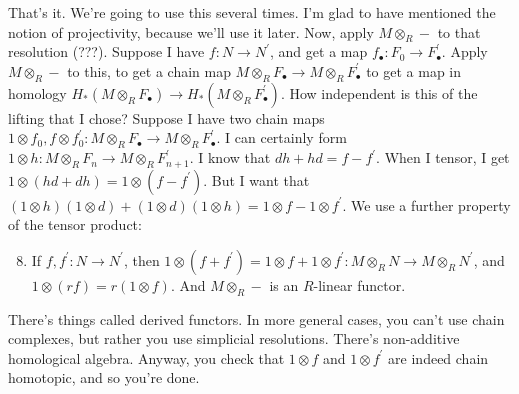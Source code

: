\documentclass{amsart}
\theoremstyle{theorem}
\theoremstyle{definition}
\begin{document}
That's it. We're going to use this several times. I'm glad to have mentioned the notion of projectivity, because we'll use it later. Now, apply $M\otimes_R -$ to that resolution (???). Suppose I have $f:N\to N^\prime$, and get a map $f_\bullet:F_0\to F^\prime_\bullet$. Apply $M\otimes_R -$ to this, to get a chain map $M\otimes_R F_\bullet\to M\otimes_R F^\prime_\bullet$ to get a map in homology $ H_\ast(M\otimes_R F_\bullet)\to H_\ast(M\otimes_R F^\prime_\bullet)$. How independent is this of the lifting that I chose? Suppose I have two chain maps $1\otimes f_0,f\otimes f_0^\prime:M\otimes_R F_\bullet\to M\otimes_R F^\prime_\bullet$. I can certainly form $1\otimes h:M\otimes_R F_n\to M\otimes_R F^\prime_{n+1}$. I know that $dh+hd=f-f^\prime$. When I tensor, I get $1\otimes(hd+dh)=1\otimes(f-f^\prime)$. But I want that $(1\otimes h)(1\otimes d)+(1\otimes d)(1\otimes h)=1\otimes f-1\otimes f^\prime$. We use a further property of the tensor product:
\begin{enumerate}
\setcounter{enumi}{7}
\item If $f,f^\prime:N\to N^\prime$, then $1\otimes(f+f^\prime)=1\otimes f+1\otimes f^\prime:M\otimes_R N\to M\otimes_R N^\prime$, and $1\otimes(rf)=r(1\otimes f)$. And $M\otimes_R -$ is an $R$-linear functor. 
\end{enumerate}
There's things called derived functors. In more general cases, you can't use chain complexes, but rather you use simplicial resolutions. There's non-additive homological algebra. Anyway, you check that $1\otimes f$ and $1\otimes f^\prime$ are indeed chain homotopic, and so you're done.
\end{document}
